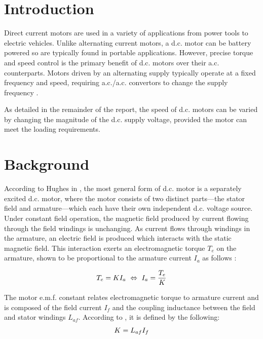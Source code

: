 \documentclass[a4paper,11pt,twocolumn]{article}
\newcommand{\AC}{a.c.\xspace}
\newcommand{\DC}{d.c.\xspace}
\newcommand{\EMF}{e.m.f.\xspace}
\begin{document}
\printnomenclature

\section{Introduction}

Direct current motors are used in a variety of applications from power tools to 
electric vehicles. Unlike alternating current motors, a \DC motor can be 
battery powered so are typically found in portable applications. However, 
precise torque and speed control is the primary benefit of \DC motors over 
their \AC counterparts. Motors driven by an alternating supply typically 
operate at a fixed frequency and speed, requiring \AC/\AC convertors to change 
the supply frequency \cite[p. 787]{hughes2010hughes}.

As detailed in the remainder of the report, the speed of \DC motors can be 
varied by changing the magnitude of the \DC supply voltage, provided the motor 
can meet the loading requirements.

\section{Background} \label{sec:Background}

According to Hughes in \cite[p.~870]{hughes2010hughes}, the most general form 
of \DC motor is a separately excited \DC motor, where the motor consists of two 
distinct parts---the stator field and armature---which each have their own 
independent \DC voltage source. Under constant field operation, the magnetic 
field produced by current flowing through the field windings is unchanging. As 
current flows through windings in the armature, an electric field is produced 
which interacts with the static magnetic field. This interaction exerts an 
electromagnetic torque $T_e$ on the armature, shown to be proportional to the 
armature current $I_a$ as follows \cite[p.~873]{hughes2010hughes}:

\begin{equation}  \label{eq:T}
    T_e = K I_a ~\Leftrightarrow~ I_a = \frac{T_e}{K} \\
\end{equation}

The motor \EMF constant relates electromagnetic torque to armature current and 
is composed of the field current $I_f$ and the coupling inductance between the 
field and stator windings $L_{af}$. According to \cite{brigham2016coursework}, 
it is defined by the following:
\begin{equation} \label{eq:K}
    K = L_{af} I_f \\
\end{equation}
\end{document}
